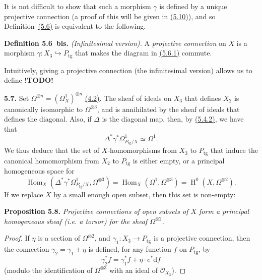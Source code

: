 \documentclass{report}
\newenvironment{itenv}[1]
  {\phantomsection\par\medskip\noindent\textbf{#1.}\itshape}
  {\medskip}
\newenvironment{rmenv}[1]
  {\phantomsection\par\medskip\noindent\textbf{#1.}\rmfamily}
  {\medskip}
\renewcommand{\cal}[1]{{\mathcal{#1}}}
\newcommand{\dd}{\mathrm{d}}
\newcommand{\tg}{\mathrm{tg}}
\DeclareMathOperator{\Hom}{Hom}
\DeclareMathOperator{\HH}{H}
\newcommand{\todo}{\textbf{ !TODO! }}
\newcommand{\oldpage}[1]{\marginpar{\footnotesize$\Big\vert$ \textit{p.~#1}}}
\begin{document}
It is not difficult to show that such a morphism $\gamma$ is defined by a unique projective connection (a proof of this will be given in \hyperref[I.5.10]{(5.10)}), and so Definition~\hyperref[I.5.6]{(5.6)} is equivalent to the following.

\begin{rmenv}{Definition 5.6~bis}
\label{I.5.6bis}
  \emph{(Infinitesimal version).}
  A \emph{projective connection} on $X$ is a morphism $\gamma\colon X_3\hookrightarrow P_\tg$ that makes the diagram in \hyperref[I.5.6.1]{(5.6.1)} commute.
\end{rmenv}

Intuitively, giving a projective connection (the infinitesimal version) allows us to define \todo

\begin{rmenv}{5.7}
\label{I.5.7}
  Set $\Omega^{\otimes n}=(\Omega_X^1)^{\otimes n}$ \hyperref[I.4.2]{(4.2)}.
  The sheaf of ideals on $X_3$ that defines $X_2$ is
\oldpage{32}
  canonically isomorphic to $\Omega^{\otimes3}$, and is annihilated by the sheaf of ideals that defines the diagonal.
  Also, if $\Delta$ is the diagonal map, then, by \hyperref[I.5.4.2]{(5.4.2)}, we have that
  \[
    \Delta^*\gamma^*\Omega_{P_\tg/X}^1 \simeq \Omega^1.
  \]
  We thus deduce that the set of $X$-homomorphisms from $X_3$ to $P_\tg$ that induce the canonical homomorphism from $X_2$ to $P_\tg$ is either empty, or a principal homogeneous space for
  \[
    \Hom_X(\Delta^*\gamma^*\Omega_{P_\tg/X}^1, \Omega^{\otimes3})
    = \Hom_X(\Omega^1,\Omega^{\otimes3})
    = \HH^0(X,\Omega^{\otimes2}).
  \]
  If we replace $X$ by a small enough open subset, then this set is non-empty:
\end{rmenv}

\begin{itenv}{Proposition 5.8}
\label{I.5.8}
  Projective connections of open subsets of $X$ form a principal homogeneous sheaf (i.e. a torsor) for the sheaf $\Omega^{\otimes2}$.
\end{itenv}

\begin{proof}
  If $\eta$ is a section of $\Omega^{\otimes2}$, and $\gamma_1\colon X_3\to P_\tg$ is a projective connection, then the connection $\gamma_2=\gamma_1+\eta$ is defined, for any function $f$ on $P_\tg$, by
  \[
  \label{I.5.8.1}
    \gamma_2^*f = \gamma_1^*f + \eta\cdot e^*\dd f
  \tag{5.8.1}
  \]
  (modulo the identification of $\Omega^{\otimes3}$ with an ideal of $\cal{O}_{X_3}$).
\end{proof}
\end{document}
